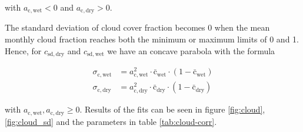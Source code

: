 \documentclass[
11pt, %
english, %
singlespacing, %
headsepline, %
]{MastersDoctoralThesis} %
\begin{document}
\begin{NoHyper}
\begin{refsection}
with $a_{\mathrm{c}, \mathrm{wet}} < 0$ and $a_{\mathrm{c}, \mathrm{dry}} > 0$.

The standard deviation of cloud cover fraction becomes 0 when the mean monthly cloud fraction reaches both the minimum or maximum limits of 0 and 1. Hence, for $c_\mathrm{sd,dry}$ and $c_\mathrm{sd,wet}$ we have an concave parabola with the formula

\begin{align}
\sigma_{\mathrm{c}, \mathrm{wet}} &= a_{\mathrm{c}, \mathrm{wet}}^2 \cdot \bar{\mathrm{c}}_\mathrm{wet} \cdot (1 - \bar{\mathrm{c}}_\mathrm{wet}) \nonumber \\
\sigma_{\mathrm{c}, \mathrm{dry}} &= a_{\mathrm{c}, \mathrm{dry}}^2 \cdot \bar{\mathrm{c}}_\mathrm{dry} \cdot (1 - \bar{\mathrm{c}}_\mathrm{dry}) \label{eq:cloud_sd}
\end{align}

with $a_{\mathrm{c}, \mathrm{wet}}, a_{\mathrm{c}, \mathrm{dry}} \geq 0$. Results of the fits can be seen in figure \ref{fig:cloud}, \ref{fig:cloud_sd} and the parameters in table \ref{tab:cloud-corr}.



\end{refsection}
\end{NoHyper}
\end{document}

